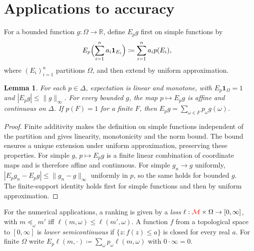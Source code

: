 \documentclass[11pt]{article}
\newcommand{\chg}[1]{{\color{red}#1}}
\newtheorem{lemma}[theorem]{Lemma}
\theoremstyle{definition}
\theoremstyle{remark}
\newcommand{\M}{\mathcal M}
\begin{document}
\section{Applications to accuracy}\label{sec:applications}

For a bounded function $g:\Omega\to\mathbb R$, define $E_pg$ first on simple functions by
\[
E_p\Bigl(\sum_{i=1}^n a_i\mathbf1_{E_i}\Bigr)
\coloneqq\sum_{i=1}^n a_i p(E_i),
\]
where $(E_i)_{i=1}^n$ partitions $\Omega$, and then extend by uniform approximation.

\begin{lemma}\label{lem:prob}
For each $p\in\Delta$, expectation is linear and monotone, with $E_p\mathbf1_\Omega=1$ and $|E_pg|\le\|g\|_\infty$. For every bounded $g$, the map $p\mapsto E_pg$ is affine and continuous on $\Delta$. If $p(F)=1$ for a finite $F$, then $E_pg=\sum_{\omega\in F}p_\omega g(\omega)$.
\end{lemma}
\begin{proof}
Finite additivity makes the definition on simple functions independent of the partition and gives linearity, monotonicity and the norm bound. The bound ensures a unique extension under uniform approximation, preserving these properties. For simple $g$, $p\mapsto E_pg$ is a finite linear combination of coordinate maps and is therefore affine and continuous. For simple $g_n\to g$ uniformly, $|E_pg_n-E_pg|\le\|g_n-g\|_\infty$ uniformly in $p$, so the same holds for bounded $g$. The finite-support identity holds first for simple functions and then by uniform approximation.
\end{proof}

For the numerical applications, a ranking is given by a \emph{loss} $\ell:\chg{\M}\times\Omega\to[0,\infty]$, with $m\preceq_\omega m'$ iff $\ell(m,\omega)\le\ell(m',\omega)$. A function $f$ from a topological space to $[0,\infty]$ is \emph{lower semicontinuous} if $\{z:f(z)\le a\}$ is closed for every real $a$. For finite $\Omega$ write $E_p\ell(m,\cdot)\coloneqq\sum_\omega p_\omega\ell(m,\omega)$ with $0\cdot\infty=0$.
\end{document}
